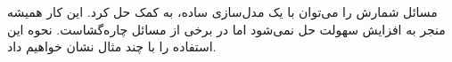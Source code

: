\p
مسائل شمارش را می‌توان با یک مدل‌سازی ساده، به کمک 
 حل کرد.
این کار همیشه منجر به افزایش سهولت حل نمی‌شود اما در برخی از مسائل چاره‌گشاست.
نحوه این استفاده را با چند مثال نشان خواهیم داد.



